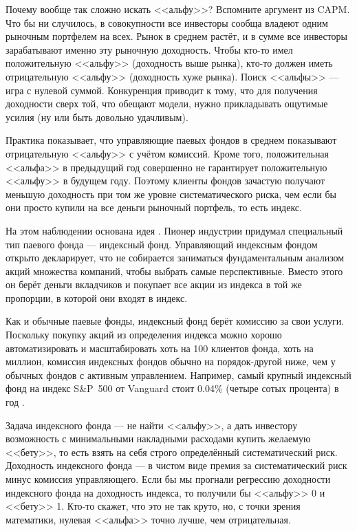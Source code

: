 Почему вообще так сложно искать <<альфу>>? Вспомните аргумент из CAPM. Что бы ни 
случилось, в совокупности все инвесторы сообща владеют одним рыночным портфелем 
на всех. Рынок в среднем растёт, и в сумме все инвесторы зарабатывают именно эту 
рыночную доходность. Чтобы кто-то имел положительную <<альфу>> (доходность выше 
рынка), кто-то должен иметь отрицательную <<альфу>> (доходность хуже рынка). 
Поиск <<альфы>> --- игра с нулевой суммой. Конкуренция приводит к тому, что 
для получения доходности сверх той, что обещают модели, нужно прикладывать 
ощутимые усилия (ну или быть довольно удачливым).

Практика показывает, что управляющие паевых фондов в среднем показывают 
отрицательную <<альфу>> с учётом комиссий. Кроме того, положительная <<альфа>> в 
предыдущий год совершенно не гарантирует положительную <<альфу>> в будущем году. 
Поэтому клиенты фондов зачастую получают меньшую доходность при том же уровне 
систематического риска, чем если бы они просто купили на все деньги рыночный 
портфель, то есть индекс.

На этом наблюдении основана идея . Пионер индустрии  придумал специальный 
тип паевого фонда --- индексный фонд. Управляющий индексным фондом открыто 
декларирует, что не собирается заниматься фундаментальным анализом акций 
множества компаний, чтобы выбрать самые перспективные. Вместо этого он берёт 
деньги вкладчиков и покупает все акции из индекса в той же пропорции, в которой 
они входят в индекс.

Как и обычные паевые фонды, индексный фонд берёт комиссию за свои услуги. 
Поскольку покупку акций из определения индекса можно хорошо автоматизировать и 
масштабировать хоть на 100 клиентов фонда, хоть на миллион, комиссия индексных 
фондов обычно на порядок-другой ниже, чем у обычных фондов с активным  
управлением. Например, самый крупный индексный фонд на индекс S\&P~500 от 
Vanguard стоит 0.04\% (четыре сотых процента) в год \cite{vanguard500}.

Задача индексного фонда --- не найти <<альфу>>, а дать инвестору возможность с 
минимальными накладными расходами купить желаемую <<бету>>, то есть взять на 
себя строго определённый систематический риск. Доходность индексного фонда --- в 
чистом виде премия за систематический риск минус комиссия управляющего. Если бы 
мы прогнали регрессию доходности индексного фонда на доходность индекса, то 
получили бы <<альфу>> 0 и <<бету>> 1. Кто-то скажет, что это не так круто, но, с 
точки зрения математики, нулевая <<альфа>> точно лучше, чем отрицательная.

